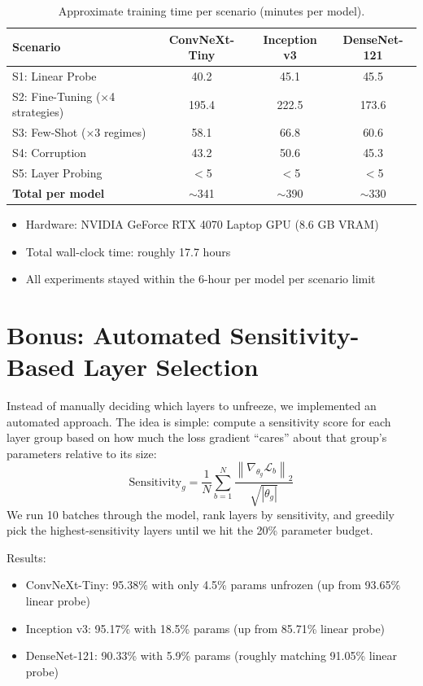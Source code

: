 \documentclass[11pt,a4paper]{article}
\begin{document}
\begin{table}[H]
\centering
\caption{Approximate training time per scenario (minutes per model).}
\label{tab:compute}
\begin{tabular}{lccc}
\toprule
\textbf{Scenario} & \textbf{ConvNeXt-Tiny} & \textbf{Inception v3} & \textbf{DenseNet-121} \\
\midrule
S1: Linear Probe   & 40.2 & 45.1 & 45.5 \\
S2: Fine-Tuning ($\times$4 strategies)   & 195.4 & 222.5 & 173.6 \\
S3: Few-Shot ($\times$3 regimes)  & 58.1 & 66.8 & 60.6 \\
S4: Corruption      & 43.2 & 50.6 & 45.3 \\
S5: Layer Probing   & $<$5 & $<$5 & $<$5 \\
\midrule
\textbf{Total per model} & $\sim$341 & $\sim$390 & $\sim$330 \\
\bottomrule
\end{tabular}
\end{table}

\begin{itemize}[nosep]
  \item Hardware: NVIDIA GeForce RTX 4070 Laptop GPU (8.6 GB VRAM)
  \item Total wall-clock time: roughly 17.7 hours
  \item All experiments stayed within the 6-hour per model per scenario limit
\end{itemize}

\section{Bonus: Automated Sensitivity-Based Layer Selection}

Instead of manually deciding which layers to unfreeze, we implemented an automated approach.
The idea is simple: compute a sensitivity score for each layer group based on how much the loss gradient ``cares'' about that group's parameters relative to its size:
\[
  \text{Sensitivity}_g = \frac{1}{N} \sum_{b=1}^{N} \frac{\left\lVert \nabla_{\theta_g} \mathcal{L}_b \right\rVert_2}{\sqrt{|\theta_g|}}
\]
We run 10 batches through the model, rank layers by sensitivity, and greedily pick the highest-sensitivity layers until we hit the 20\% parameter budget.

Results:
\begin{itemize}[nosep]
  \item ConvNeXt-Tiny: 95.38\% with only 4.5\% params unfrozen (up from 93.65\% linear probe)
  \item Inception v3: 95.17\% with 18.5\% params (up from 85.71\% linear probe)
  \item DenseNet-121: 90.33\% with 5.9\% params (roughly matching 91.05\% linear probe)
\end{itemize}
\end{document}
